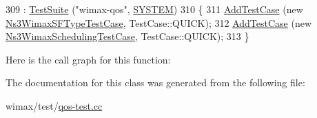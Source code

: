 \begin{DoxyCode}
309   : \hyperlink{classns3_1_1TestSuite_a904b0c40583b744d30908aeb94636d1a}{TestSuite} (\textcolor{stringliteral}{"wimax-qos"}, \hyperlink{classns3_1_1TestSuite_a1ebfcab34ec8161e085e8e3a1855eae0a90c5529a26ab3a5ffcc6e57040dbd82e}{SYSTEM})
310 \{
311   \hyperlink{classns3_1_1TestCase_a3718088e3eefd5d6454569d2e0ddd835}{AddTestCase} (\textcolor{keyword}{new} \hyperlink{classNs3WimaxSFTypeTestCase}{Ns3WimaxSFTypeTestCase}, TestCase::QUICK);
312   \hyperlink{classns3_1_1TestCase_a3718088e3eefd5d6454569d2e0ddd835}{AddTestCase} (\textcolor{keyword}{new} \hyperlink{classNs3WimaxSchedulingTestCase}{Ns3WimaxSchedulingTestCase}, TestCase::QUICK);
313 \}
\end{DoxyCode}


Here is the call graph for this function\+:




The documentation for this class was generated from the following file\+:\begin{DoxyCompactItemize}
\item 
wimax/test/\hyperlink{qos-test_8cc}{qos-\/test.\+cc}\end{DoxyCompactItemize}
